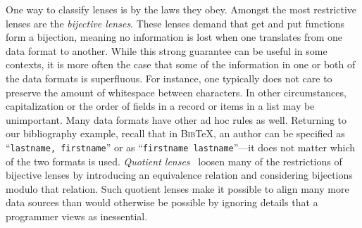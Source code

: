 \documentclass[acmsmall,review,anonymous]{acmart}\settopmatter{printfolios=true,printccs=false,printacmref=false}
\newcommand{\bibtex}{\textsc{Bib}\TeX{}}
\newcommand{\cd}[1]{\lstinline[backgroundcolor=\color{white}]$#1$}
\begin{document}
One way to classify lenses is by the laws they obey.  Amongst the most
restrictive lenses are the \emph{bijective lenses}.  These lenses demand
that get and put functions form a bijection, meaning no information
is lost when one translates from one data format to another.  While this
strong guarantee can be useful in some contexts, it is more often the case
that some of the information in one or both of the data formats is superfluous.
For instance, one typically does not care to preserve the amount of
whitespace between characters.  In other circumstances, capitalization
or the order of fields in a record or items in a list may be unimportant.
%
Many data formats have other ad hoc rules as well.  
Returning to our bibliography example, recall that in \bibtex{},
an author can be specified as
``\cd{lastname, firstname}'' or as ``\cd{firstname lastname}''---it does not matter which of the
two formats is used.
%
{\em Quotient lenses}~\cite{quotientlenses} loosen many of the restrictions
of bijective lenses by introducing an equivalence relation and considering
bijections modulo that relation.  Such quotient lenses make it possible
to align many more data sources than would otherwise be possible by
ignoring details that a programmer views as inessential.
\end{document}
